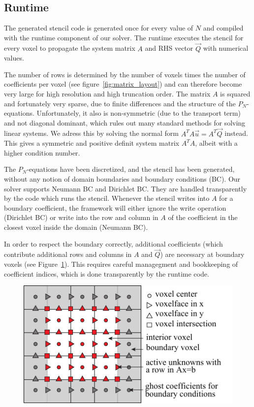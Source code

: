 \subsection{Runtime}
\label{sec:solver_runtime}

The generated stencil code is generated once for every value of $N$ and compiled with the runtime component of our solver. The runtime executes the stencil for every voxel to propagate the system matrix $A$ and RHS vector $\vec{Q}$ with numerical values.

The number of rows is determined by the number of voxels times the number of coefficients per voxel (see figure~\ref{fig:matrix_layout}) and can therefore become very large for high resolution and high truncation order. The matrix $A$ is squared and fortunately very sparse, due to finite differences and the structure of the $P_N$-equations. Unfortunately, it also is non-symmetric (due to the transport term) and not diagonal dominant, which rules out many standard methods for solving linear systems. We adress this by solving the normal form $A^TA\vec{u}=A^T\vec{Q}$ instead. This gives a symmetric and positive definit system matrix $A^TA$, albeit with a higher condition number.


The $P_N$-equations have been discretized, and the stencil has been generated, without any notion of domain boundaries and boundary conditions (BC). Our solver supports Neumann BC and Dirichlet BC. They are handled transparently by the code which runs the stencil. Whenever the stencil writes into $A$ for a boundary coefficient, the framework will either ignore the write operation (Dirichlet BC) or write into the row and column in $A$ of the coefficient in the closest voxel inside the domain (Neumann BC).

In order to respect the boundary correctly, additional coefficients (which contribute additional rows and columns in $A$ and $\vec{Q}$) are necessary at boundary voxels (see Figure~\ref{fig:staggeredgrid}). This requires careful managegment and bookkeeping of coefficient indices, which is done transparently by the runtime code.




\begin{figure}[h]
\centering
\includegraphics[width=0.5\columnwidth]{figures/fig_staggered_grids.pdf}
\label{fig:staggeredgrid}
\end{figure}

